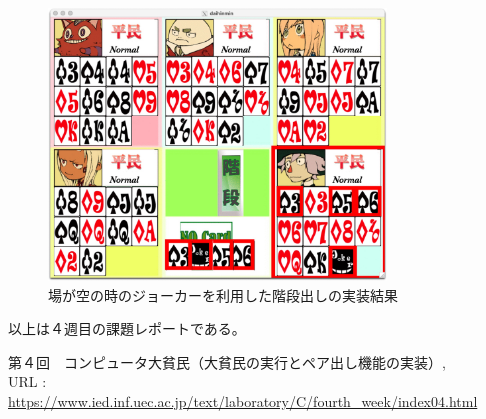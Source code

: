 \documentclass[]{jsarticle}
\begin{document}
\begin{figure}[h]
  \centering
  \includegraphics[width=0.8\textwidth]{./kadai10sequence.jpg}
  \caption{場が空の時のジョーカーを利用した階段出しの実装結果}
\end{figure}


\noindent 以上は４週目の課題レポートである。

\begin{thebibliography}{99}
   第４回　コンピュータ大貧民（大貧民の実行とペア出し機能の実装）, \\URL : \url{https://www.ied.inf.uec.ac.jp/text/laboratory/C/fourth_week/index04.html}
\end{thebibliography}
\end{document}
